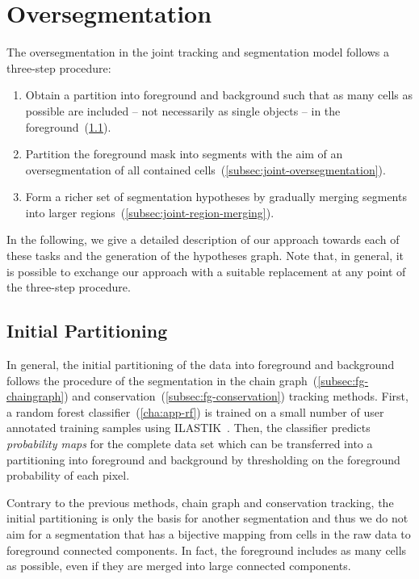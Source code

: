 \section{Oversegmentation}
\label{sec:joint-oversegmentation}

The oversegmentation in the joint tracking and segmentation model follows a three-step procedure:
\begin{enumerate}
    \item Obtain a partition into foreground and background such that as many cells as possible are
  included -- not necessarily as single objects -- in the foreground~(\cref{subsec:joint-undersegmentation}).
    \item Partition the foreground mask into segments with the aim of an oversegmentation of all
  contained cells~(\cref{subsec:joint-oversegmentation}).
    \item Form a richer set of segmentation hypotheses by gradually merging segments into larger
  regions~(\cref{subsec:joint-region-merging}).
\end{enumerate}
In the following, we give a detailed description of our approach towards each of these tasks and the
generation of the hypotheses graph. Note that, in general, it is possible to exchange our approach
with a suitable replacement at any point of the three-step procedure.

\subsection{Initial Partitioning}
\label{subsec:joint-undersegmentation}
In general, the initial partitioning of the data into foreground and background follows the
procedure of the segmentation in the chain graph~(\cref{subsec:fg-chaingraph}) and
conservation~(\cref{subsec:fg-conservation}) tracking methods. First, a random forest
classifier~(\cref{cha:app-rf}) is trained on a small number of user annotated training samples using
ILASTIK~\citep{sommer_11_ilastik}. Then, the classifier predicts \emph{probability maps} for the
complete data set which can be transferred into a partitioning into foreground and background by
thresholding on the foreground probability of each pixel.

Contrary to the previous methods, chain graph and conservation tracking, the initial partitioning is
only the basis for another segmentation and thus we do not aim for a segmentation that has a
bijective mapping from cells in the raw data to foreground connected components. In fact, the
foreground includes as many cells as possible, even if they are merged into large connected
components.


